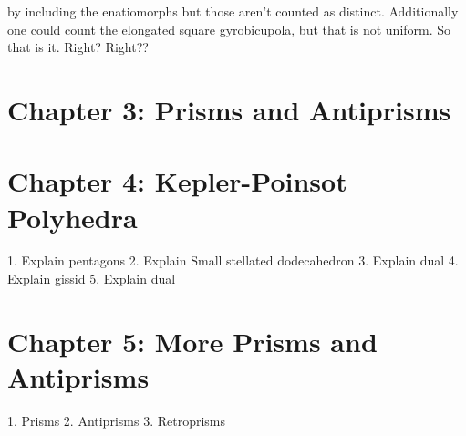 \documentclass{article}
\begin{document}
by including the enatiomorphs but those aren't counted as distinct. Additionally one could count the elongated square gyrobicupola, but that is not uniform. So that is it. Right? Right??
\section*{Chapter 3: Prisms and Antiprisms}

\section*{Chapter 4: Kepler-Poinsot Polyhedra}
1. Explain pentagons
2. Explain Small stellated dodecahedron
3. Explain dual
4. Explain gissid
5. Explain dual
 \section*{Chapter 5: More Prisms and Antiprisms}
1. Prisms
2. Antiprisms
3. Retroprisms
\end{document}
